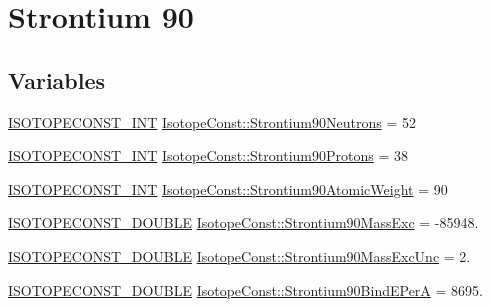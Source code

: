 \hypertarget{group___isotope_const-_strontium-_sr90}{}\section{Strontium 90}
\label{group___isotope_const-_strontium-_sr90}
\subsection*{Variables}
\begin{DoxyCompactItemize}
\item 
\mbox{\hyperlink{group___isotope_const-_macros_ga5f18360b3e99483a35c32d789e62621c}{I\+S\+O\+T\+O\+P\+E\+C\+O\+N\+S\+T\+\_\+\+I\+NT}} \mbox{\hyperlink{group___isotope_const-_strontium-_sr90_gaadf30a5f8ba02b372c2c425311b6d295}{Isotope\+Const\+::\+Strontium90\+Neutrons}} = 52
\item 
\mbox{\hyperlink{group___isotope_const-_macros_ga5f18360b3e99483a35c32d789e62621c}{I\+S\+O\+T\+O\+P\+E\+C\+O\+N\+S\+T\+\_\+\+I\+NT}} \mbox{\hyperlink{group___isotope_const-_strontium-_sr90_ga8b21b7fa136fd25d31f402452fcb9c34}{Isotope\+Const\+::\+Strontium90\+Protons}} = 38
\item 
\mbox{\hyperlink{group___isotope_const-_macros_ga5f18360b3e99483a35c32d789e62621c}{I\+S\+O\+T\+O\+P\+E\+C\+O\+N\+S\+T\+\_\+\+I\+NT}} \mbox{\hyperlink{group___isotope_const-_strontium-_sr90_gaf3d55838462db24b13661e4cbf6efd03}{Isotope\+Const\+::\+Strontium90\+Atomic\+Weight}} = 90
\item 
\mbox{\hyperlink{group___isotope_const-_macros_ga8f45a7272ce02c0b4c65c44636ed719a}{I\+S\+O\+T\+O\+P\+E\+C\+O\+N\+S\+T\+\_\+\+D\+O\+U\+B\+LE}} \mbox{\hyperlink{group___isotope_const-_strontium-_sr90_ga1e9eccfdc3cc451a5e29e8f25eb2ae1d}{Isotope\+Const\+::\+Strontium90\+Mass\+Exc}} = -\/85948.
\item 
\mbox{\hyperlink{group___isotope_const-_macros_ga8f45a7272ce02c0b4c65c44636ed719a}{I\+S\+O\+T\+O\+P\+E\+C\+O\+N\+S\+T\+\_\+\+D\+O\+U\+B\+LE}} \mbox{\hyperlink{group___isotope_const-_strontium-_sr90_ga18d982aa835d82162f9f8a781954d70b}{Isotope\+Const\+::\+Strontium90\+Mass\+Exc\+Unc}} = 2.
\item 
\mbox{\hyperlink{group___isotope_const-_macros_ga8f45a7272ce02c0b4c65c44636ed719a}{I\+S\+O\+T\+O\+P\+E\+C\+O\+N\+S\+T\+\_\+\+D\+O\+U\+B\+LE}} \mbox{\hyperlink{group___isotope_const-_strontium-_sr90_gaa7439fc9a9794e1659e3df35354e8673}{Isotope\+Const\+::\+Strontium90\+Bind\+E\+PerA}} = 8695.
\item 

\end{DoxyCompactItemize}
